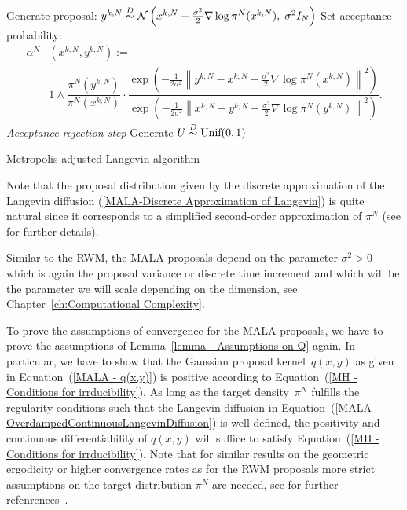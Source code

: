 \IncMargin{1em}
\begin{algorithm}[htb]
\DontPrintSemicolon


\BlankLine

{
  Generate proposal: $ y^{k,N} \stackrel{D}{\thicksim} \mathcal{N}\left(x^{k,N} + \frac{\sigma^2}{2} \nabla \log \pi^{N}(x^{k,N}), \; \sigma^2 I_N\right) $\;
  Set acceptance probability:
  \begin{align*}
   \alpha^{N} & ( x^{k,N}, y^{k,N} )  := \\ 
   & 1 \wedge  \dfrac{\pi^{N}(y^{k,N}) }{\pi^{N}(x^{k,N})} \cdot
    \dfrac{ \exp{\left( - \frac{1}{2\sigma^2} \left\| y^{k,N} - x^{k,N} - \frac{\sigma^2}{2} \nabla \log \pi^{N}(x^{k,N}) \right\|^2 \right)} }{ \exp{\left( - \frac{1}{2\sigma^2} \left\| x^{k,N} - y^{k,N} - \frac{\sigma^2}{2} \nabla \log \pi^{N}(y^{k,N}) \right\|^2 \right)} }.    
  \end{align*}\label{MALAAlgo-AcceptanceProba}
  \emph{Acceptance-rejection step}\;
  Generate $ U \stackrel{D}{\thicksim} \text{Unif}(0,1) $\;

}
\caption{Metropolis adjusted Langevin algorithm}\label{Algo-MALA}
\end{algorithm}\DecMargin{1em}


\begin{rem}
 Note that the proposal distribution given by the discrete approximation of the Langevin diffusion (\ref{MALA-Discrete Approximation of Langevin}) is quite natural since it corresponds to a simplified second-order approximation of $ \pi^{N} $ (see \autocite[Section 7.8.5]{Robert2005} for further details).
\end{rem} 

Similar to the RWM, the MALA proposals depend on the parameter $ \sigma^2 > 0 $ which is again the proposal variance or discrete time increment and which will be the parameter we will scale depending on the dimension, see Chapter~\ref{ch:Computational Complexity}.

To prove the assumptions of convergence for the MALA proposals, we have to prove the assumptions of Lemma~\ref{lemma - Assumptions on Q} again. In particular, we have to show that the Gaussian proposal kernel~$q(x,y)$  as given in Equation~(\ref{MALA - q(x,y)}) is positive according to Equation~(\ref{MH - Conditions for irrducibility}). As long as the target density~$\pi^N$ fulfills the regularity conditions such that the Langevin diffusion in Equation~(\ref{MALA-OverdampedContinuousLangevinDiffusion}) is well-defined, the positivity and continuous differentiability of $q(x,y)$ will suffice to satisfy Equation~(\ref{MH - Conditions for irrducibility}). Note that for similar results on the geometric ergodicity or higher convergence rates as for the RWM proposals more strict assumptions on the target distribution $ \pi^{N} $ are needed, see for further refenrences~\autocite{RobertsTweedie1996}.